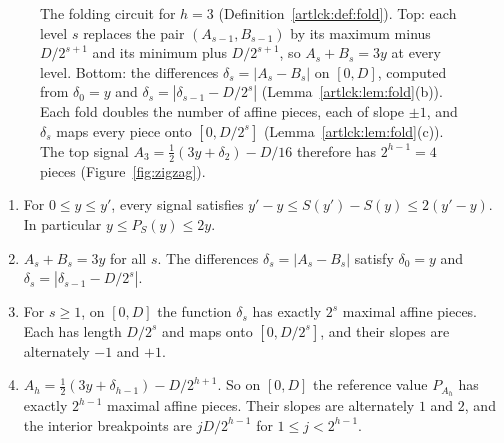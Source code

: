 \begin{figure}[t]
\caption{The folding circuit for $h=3$ (Definition~\ref{artlck:def:fold}). Top: each level $s$ replaces
the pair $(A_{s-1},B_{s-1})$ by its maximum minus $D/2^{s+1}$ and its minimum plus $D/2^{s+1}$, so
$A_s+B_s=3y$ at every level. Bottom: the differences $\delta_s=|A_s-B_s|$ on $[0,D]$, computed from
$\delta_0=y$ and $\delta_s=|\delta_{s-1}-D/2^s|$ (Lemma~\ref{artlck:lem:fold}(b)). Each fold doubles the
number of affine pieces, each of slope $\pm1$, and $\delta_s$ maps every piece onto $[0,D/2^s]$
(Lemma~\ref{artlck:lem:fold}(c)). The top signal $A_3=\tfrac12(3y+\delta_2)-D/16$ therefore has
$2^{h-1}=4$ pieces (Figure~\ref{fig:zigzag}).}
\label{fig:fold}
\end{figure}

\begin{lemma}[Folding]\label{artlck:lem:fold}
\statusrefereed
\begin{enumerate}[label=(\alph*),nosep]
\item For $0\le y\le y'$, every signal satisfies $y'-y\le S(y')-S(y)\le2(y'-y)$. In particular
$y\le P_S(y)\le2y$.
\item $A_s+B_s=3y$ for all $s$. The differences $\delta_s=|A_s-B_s|$ satisfy $\delta_0=y$ and
$\delta_s=|\delta_{s-1}-D/2^s|$.
\item For $s\ge1$, on $[0,D]$ the function $\delta_s$ has exactly $2^s$ maximal affine pieces. Each has
length $D/2^s$ and maps onto $[0,D/2^s]$, and their slopes are alternately $-1$ and $+1$.
\item $A_h=\tfrac12(3y+\delta_{h-1})-D/2^{h+1}$. So on $[0,D]$ the reference value $P_{A_h}$ has exactly
$2^{h-1}$ maximal affine pieces. Their slopes are alternately $1$ and $2$, and the interior breakpoints
are $jD/2^{h-1}$ for $1\le j<2^{h-1}$.
\end{enumerate}
\end{lemma}

